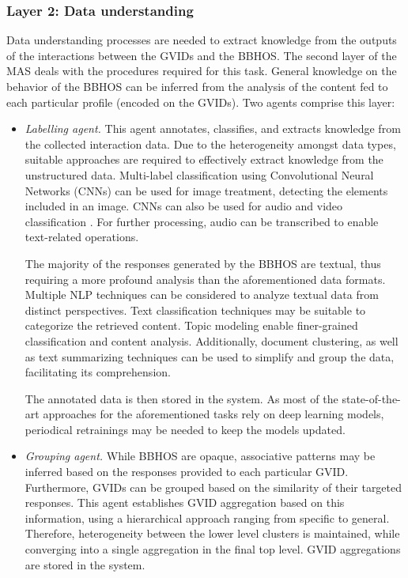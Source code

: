 \subsubsection*{Layer 2: Data understanding}
Data understanding processes are needed to extract knowledge from the outputs of the interactions between the GVIDs and the BBHOS. The second layer of the MAS deals with the procedures required for this task. General knowledge on the behavior of the BBHOS can be inferred from the analysis of the content fed to each particular profile (encoded on the GVIDs). Two agents comprise this layer:
\begin{itemize}
    \item \textit{Labelling agent.} This agent annotates, classifies, and extracts knowledge from the collected interaction data. Due to the heterogeneity amongst data types, suitable approaches are required to effectively extract knowledge from the unstructured data. Multi-label classification using Convolutional Neural Networks (CNNs) \citep{He2015DeepRL,CNNRNN} can be used for image treatment, detecting the elements included in an image. CNNs can also be used for audio and video classification \citep{HersheyCEGJMPPS16}. For further processing, audio can be transcribed \citep{speechrecognition} to enable text-related operations. 
    
    The majority of the responses generated by the BBHOS are textual, thus requiring a more profound analysis than the aforementioned data formats. Multiple NLP techniques can be considered to analyze textual data from distinct perspectives. Text classification techniques \citep{MIRONCZUK201836} may be suitable to categorize the retrieved content. Topic modeling \citep{pmlr-v15-nallapati11a,Alghamdi2015} enable finer-grained classification and content analysis. Additionally, document clustering, as well as text summarizing techniques \citep{Neto00documentclustering,YOUSEFIAZAR201793,Oikonomakou2005} can be used to simplify and group the data, facilitating its comprehension.
    
    The annotated data is then stored in the system. As most of the state-of-the-art approaches for the aforementioned tasks rely on deep learning models, periodical retrainings may be needed to keep the models updated.
    
    \item \textit{Grouping agent.} While BBHOS are opaque, associative patterns may be inferred based on the responses provided to each particular GVID. Furthermore, GVIDs can be grouped based on the similarity of their targeted responses. This agent establishes GVID aggregation based on this information, using a hierarchical approach ranging from specific to general. Therefore, heterogeneity between the lower level clusters is maintained, while converging into a single aggregation in the final top level. GVID aggregations are stored in the system.
\end{itemize}

